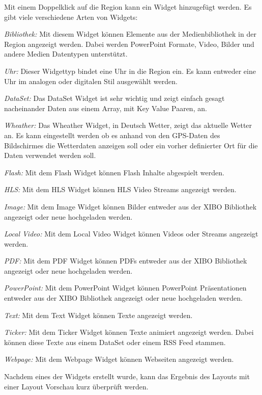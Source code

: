 Mit einem Doppelklick auf die Region kann ein Widget hinzugefügt werden. Es gibt viele verschiedene Arten von Widgets:

\begin{widgettypes}
	\item {\em Bibliothek:} Mit diesem Widget können Elemente aus der Medienbibliothek in der Region angezeigt werden. Dabei werden PowerPoint Formate, Video, Bilder und andere Medien Datentypen unterstützt.
	
	\item {\em Uhr:} 
	Dieser Widgettyp bindet eine Uhr in die Region ein. Es kann entweder eine Uhr im analogen oder digitalen Stil ausgewählt werden.
	
	\item {\em DataSet:} 
	Das DataSet Widget ist sehr wichtig und zeigt einfach gesagt nacheinander Daten aus einem Array, mit Key Value Paaren, an.
	
	\item {\em Wheather:} 
	Das Wheather Widget, in Deutsch Wetter, zeigt das aktuelle Wetter an. Es kann eingestellt werden ob es anhand von den GPS-Daten des Bildschirmes die Wetterdaten anzeigen soll oder ein vorher definierter Ort für die Daten verwendet werden soll.
	
	\item {\em Flash:} 
	Mit dem Flash Widget können Flash Inhalte abgespielt werden.
	
	\item {\em HLS:} 
	Mit dem HLS Widget können HLS Video Streams angezeigt werden.
	
	\item {\em Image:} 
	Mit dem Image Widget können Bilder entweder aus der XIBO Bibliothek angezeigt oder neue hochgeladen werden.
	
	\item {\em Local Video:} 
	Mit dem Local Video Widget können Videos oder Streams angezeigt werden.
	
	\item {\em PDF:} 
	Mit dem PDF Widget können PDFs entweder aus der XIBO Bibliothek angezeigt oder neue hochgeladen werden.
	
	\item {\em PowerPoint:} 
	Mit dem PowerPoint Widget können PowerPoint Präsentationen entweder aus der XIBO Bibliothek angezeigt oder neue hochgeladen werden.

	\item {\em Text:} 
	Mit dem Text Widget können Texte angezeigt werden.
	
	\item {\em Ticker:} 
	Mit dem Ticker Widget können Texte animiert angezeigt werden. Dabei können diese Texte aus einem DataSet oder einem RSS Feed stammen.
	
	\item {\em Webpage:} 
	Mit dem Webpage Widget können Webseiten angezeigt werden.
\end{widgettypes}

Nachdem eines der Widgets erstellt wurde, kann das Ergebnis des Layouts mit einer Layout Vorschau kurz überprüft werden.
